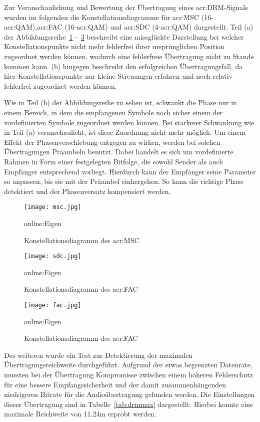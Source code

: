 Zur Veranschaulichung und Bewertung der Übertragung eines \gls{acr:DRM}-Signals wurden im folgenden die Konstellationsdiagramme für \gls{acr:MSC} (16-\gls{acr:QAM}),\gls{acr:FAC} (16-\gls{acr:QAM}) und \gls{acr:SDC} (4-\gls{acr:QAM}) dargestellt. Teil (a) der Abbildungsreihe~\ref{fig:msc} -~\ref{fig:fac} beschreibt eine missglückte Darstellung bei welcher Konstellationspunkte nicht mehr fehlerfrei ihrer ursprünglichen Position zugeordnet werden können, wodurch eine fehlerfreie Übertragung nicht zu Stande kommen kann. (b) hingegen beschreibt den erfolgreichen Übertragungsfall, da hier Konstellationspunkte nur kleine Streuungen erfahren und noch relativ fehlerfrei zugeordnet werden können.

Wie in Teil (b) der Abbildungsreihe zu sehen ist, schwankt die Phase nur in einem Bereich, in dem die empfangenen Symbole noch sicher einem der vordefinierten Symbole zugeordnet werden können. Bei stärkerer Schwankung wie in Teil (a) veranschaulicht, ist diese Zuordnung nicht mehr möglich. Um einem Effekt der Phasenverschiebung entgegen zu wirken, werden bei solchen Übertragungen Präambeln benutzt. Dabei handelt es sich um vordefinierte Rahmen in Form einer festgelegten Bitfolge, die sowohl Sender als auch Empfänger entsprechend vorliegt. Hierdurch kann der Empfänger seine Parameter so anpassen, bis sie mit der Präambel einhergehen. So kann die richtige Phase detektiert und der Phasenversatz kompensiert werden.

\begin{figure}[H]
	\centering
	\texttt{[image: msc.jpg]}
	\caption[Konstellationsdiagramm des \gls{acr:MSC}]{Konstellationsdiagramm des \gls{acr:MSC}}\gls{online:Eigen}
	\label{fig:msc}
\end{figure}

\begin{figure}[H]
	\centering
	\texttt{[image: sdc.jpg]}
	\caption[Konstellationsdiagramm des \gls{acr:SDC}]{Konstellationsdiagramm des \gls{acr:FAC}}\gls{online:Eigen}
	\label{fig:sdc}
\end{figure}

\begin{figure}[H]
	\centering
	\texttt{[image: fac.jpg]}
	\caption[Konstellationsdiagramm des \gls{acr:FAC}]{Konstellationsdiagramm des \gls{acr:FAC}}\gls{online:Eigen}
	\label{fig:fac}
\end{figure}

Des weiteren wurde ein Test zur Detektierung der maximalen Übertragungsreichweite durchgeführt. Aufgrund der etwas begrenzten Datenrate, mussten bei der Übertragung Kompromisse zwischen einem höheren Fehlerschutz für eine bessere Empfangssicherheit und der damit zusammenhängenden niedrigeren Bitrate für die Audioübertragung gefunden werden. Die Einstellungen dieser Übertragung sind in Tabelle~\ref{tab:drmmax} dargestellt. Hierbei konnte eine maximale Reichweite von 11.24m erprobt werden.

